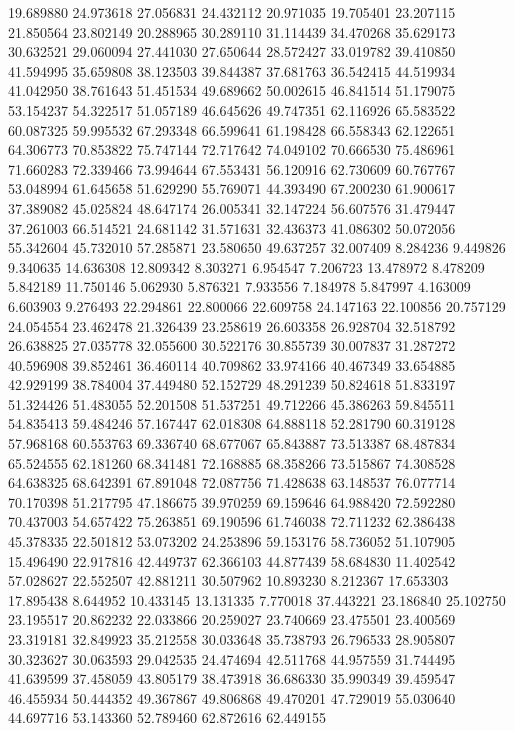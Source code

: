 19.689880
24.973618
27.056831
24.432112
20.971035
19.705401
23.207115
21.850564
23.802149
20.288965
30.289110
31.114439
34.470268
35.629173
30.632521
29.060094
27.441030
27.650644
28.572427
33.019782
39.410850
41.594995
35.659808
38.123503
39.844387
37.681763
36.542415
44.519934
41.042950
38.761643
51.451534
49.689662
50.002615
46.841514
51.179075
53.154237
54.322517
51.057189
46.645626
49.747351
62.116926
65.583522
60.087325
59.995532
67.293348
66.599641
61.198428
66.558343
62.122651
64.306773
70.853822
75.747144
72.717642
74.049102
70.666530
75.486961
71.660283
72.339466
73.994644
67.553431
56.120916
62.730609
60.767767
53.048994
61.645658
51.629290
55.769071
44.393490
67.200230
61.900617
37.389082
45.025824
48.647174
26.005341
32.147224
56.607576
31.479447
37.261003
66.514521
24.681142
31.571631
32.436373
41.086302
50.072056
55.342604
45.732010
57.285871
23.580650
49.637257
32.007409
8.284236
9.449826
9.340635
14.636308
12.809342
8.303271
6.954547
7.206723
13.478972
8.478209
5.842189
11.750146
5.062930
5.876321
7.933556
7.184978
5.847997
4.163009
6.603903
9.276493
22.294861
22.800066
22.609758
24.147163
22.100856
20.757129
24.054554
23.462478
21.326439
23.258619
26.603358
26.928704
32.518792
26.638825
27.035778
32.055600
30.522176
30.855739
30.007837
31.287272
40.596908
39.852461
36.460114
40.709862
33.974166
40.467349
33.654885
42.929199
38.784004
37.449480
52.152729
48.291239
50.824618
51.833197
51.324426
51.483055
52.201508
51.537251
49.712266
45.386263
59.845511
54.835413
59.484246
57.167447
62.018308
64.888118
52.281790
60.319128
57.968168
60.553763
69.336740
68.677067
65.843887
73.513387
68.487834
65.524555
62.181260
68.341481
72.168885
68.358266
73.515867
74.308528
64.638325
68.642391
67.891048
72.087756
71.428638
63.148537
76.077714
70.170398
51.217795
47.186675
39.970259
69.159646
64.988420
72.592280
70.437003
54.657422
75.263851
69.190596
61.746038
72.711232
62.386438
45.378335
22.501812
53.073202
24.253896
59.153176
58.736052
51.107905
15.496490
22.917816
42.449737
62.366103
44.877439
58.684830
11.402542
57.028627
22.552507
42.881211
30.507962
10.893230
8.212367
17.653303
17.895438
8.644952
10.433145
13.131335
7.770018
37.443221
23.186840
25.102750
23.195517
20.862232
22.033866
20.259027
23.740669
23.475501
23.400569
23.319181
32.849923
35.212558
30.033648
35.738793
26.796533
28.905807
30.323627
30.063593
29.042535
24.474694
42.511768
44.957559
31.744495
41.639599
37.458059
43.805179
38.473918
36.686330
35.990349
39.459547
46.455934
50.444352
49.367867
49.806868
49.470201
47.729019
55.030640
44.697716
53.143360
52.789460
62.872616
62.449155
